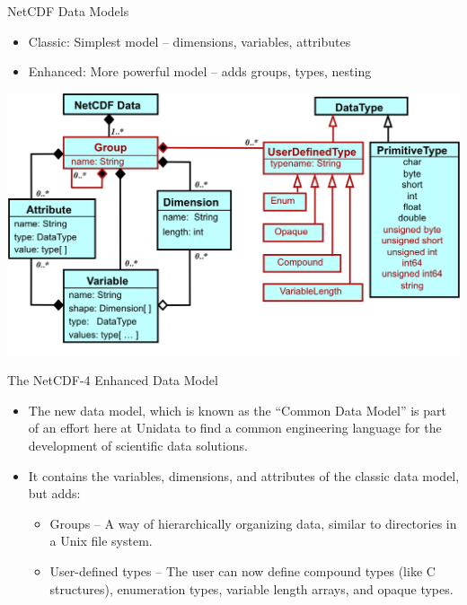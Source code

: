 \documentclass[compress,11pt,xcolor=svgnames,aspectratio=169]{beamer}
\begin{document}
\begin{frame}[t]{NetCDF Data Models}

    \begin{itemize}

        \item Classic: Simplest model -- dimensions, variables, attributes

        \item Enhanced: More powerful model -- adds groups, types, nesting

    \end{itemize}

    \begin{center}
    \includegraphics[scale=0.5]{fig/nc4-uml}
    \end{center}

\nocite{netcdf}

\end{frame}

\begin{frame}[t]{The NetCDF-4 Enhanced Data Model}

\begin{itemize}
\setlength\itemsep{0.4cm}

    \item The new data model, which is known as the “Common Data Model” is part of an effort here at Unidata to find a common engineering language for the development of scientific data solutions.

    \item It contains the variables, dimensions, and attributes of the classic data model, but adds:

    \begin{itemize}

        \item Groups -- A way of hierarchically organizing data, similar to directories in a Unix file system.

        \item User-defined types -- The user can now define compound types (like C structures), enumeration types, variable length arrays, and opaque types.

    \end{itemize}

\nocite{netcdf}

\end{itemize}

\end{frame}
\end{document}
